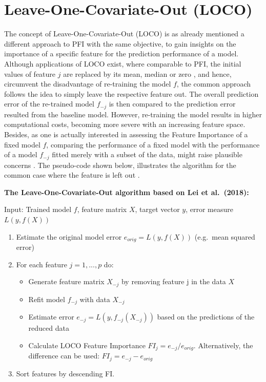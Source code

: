 \documentclass[
]{krantz}
\providecommand{\tightlist}{%
  \setlength{\itemsep}{0pt}\setlength{\parskip}{0pt}}
\begin{document}
\hypertarget{leave-one-covariate-out-loco}{%
\section{Leave-One-Covariate-Out (LOCO)}\label{leave-one-covariate-out-loco}}

The concept of Leave-One-Covariate-Out (LOCO) is as already mentioned a different approach to PFI with the same objective, to gain insights on the importance of a specific feature for the prediction performance of a model. Although applications of LOCO exist, where comparable to PFI, the initial values of feature \(j\) are replaced by its mean, median or zero \citep[see][]{hall2017ideas}, and hence, circumvent the disadvantage of re-training the model \(f\), the common approach follows the idea to simply leave the respective feature out. The overall prediction error of the re-trained model \(f_{-j}\) is then compared to the prediction error resulted from the baseline model. However, re-training the model results in higher computational costs, becoming more severe with an increasing feature space. Besides, as one is actually interested in assessing the Feature Importance of a fixed model \(f\), comparing the performance of a fixed model with the performance of a model \(f_{-j}\) fitted merely with a subset of the data, might raise plausible concerns \citep[see][]{molnar2019}.
The pseudo-code shown below, illustrates the algorithm for the common case where the feature is left out \citep[see][]{lei2018distribution}.

\textbf{The Leave-One-Covariate-Out algorithm based on Lei et al.~(2018):}

Input: Trained model \(f\), feature matrix \(X\), target vector \(y\), error measure \(L(y,f(X))\)

\begin{enumerate}
\def\labelenumi{\arabic{enumi}.}
\tightlist
\item
  Estimate the original model error \(e_{orig} = L(y,f(X))\) (e.g.~mean squared error)
\item
  For each feature \(j = 1,...,p\) do:

  \begin{itemize}
  \tightlist
  \item
    Generate feature matrix \(X_{-j}\) by removing feature j in the data \(X\)
  \item
    Refit model \(f_{-j}\) with data \(X_{-j}\)
  \item
    Estimate error \(e_{-j} = L(y,f_{-j}(X_{-j}))\) based on the predictions of the reduced data
  \item
    Calculate LOCO Feature Importance \(FI_{j} = e_{-j}/e_{orig}\). Alternatively, the difference can be used: \(FI_{j} = e_{-j} - e_{orig}\)
  \end{itemize}
\item
  Sort features by descending FI.
\end{enumerate}
\end{document}
